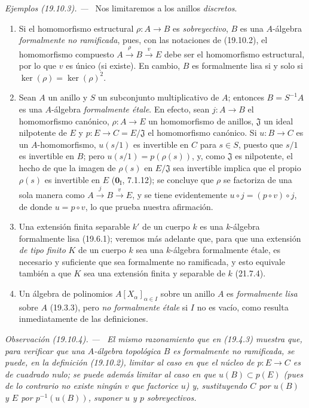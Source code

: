 \documentclass[10pt,oneside]{book}
\makeatletter
\newcommand{\setmanualcurrentlabel}[1]{\def\@currentlabel{#1}}
\newcommand{\oldpage}[2][]{%
  \setcounter{footnote}{0}%
  \marginpar{\scriptsize\textbf{#1}~|~#2}\ignorespaces}
\newenvironment{remark}[1][]{%
  \setmanualcurrentlabel{#1}\par\medskip\noindent\itshape Observación (#1). ---\ }{\par}
\newenvironment{examples}[1][]{%
  \setmanualcurrentlabel{#1}\par\medskip\noindent\textit{Ejemplos (#1). ---}\ }{\par}
\makeatother
\begin{document}
\oldpage[0\textsubscript{IV-1}]{116}

\begin{examples}[19.10.3]
\label{0.19.10.3-es}
Nos limitaremos a los anillos \emph{discretos}.
\begin{enumerate}
  \item[(i)] Si el homomorfismo estructural $\rho:A\to B$ es
  \emph{sobreyectivo}, $B$ es una $A$-álgebra \emph{formalmente no ramificada},
  pues, con las notaciones de (19.10.2), el homomorfismo compuesto
  $A\xrightarrow{\rho}B\xrightarrow{v}E$ debe ser el homomorfismo estructural,
  por lo que $v$ es único (si existe). En cambio, $B$ es formalmente lisa si y
  solo si $\ker(\rho)=\ker(\rho)^2$.
  \item[(ii)] Sean $A$ un anillo y $S$ un subconjunto multiplicativo de $A$;
  entonces $B=S^{-1}A$ es una $A$-álgebra \emph{formalmente étale}. En efecto,
  sean $j:A\to B$ el homomorfismo canónico, $\rho:A\to E$ un homomorfismo de
  anillos, $\mathfrak J$ un ideal nilpotente de $E$ y
  $p:E\to C=E/\mathfrak J$ el homomorfismo canónico. Si $u:B\to C$ es un
  $A$-homomorfismo, $u(s/1)$ es invertible en $C$ para $s\in S$, puesto que
  $s/1$ es invertible en $B$; pero $u(s/1)=p(\rho(s))$, y, como $\mathfrak J$
  es nilpotente, el hecho de que la imagen de $\rho(s)$ en $E/\mathfrak J$ sea
  invertible implica que el propio $\rho(s)$ es invertible en $E$
  ($\mathbf 0_{\mathrm I}$, 7.1.12); se concluye que $\rho$ se factoriza de una
  sola manera como $A\xrightarrow{j}B\xrightarrow{v}E$, y se tiene
  evidentemente $u\circ j=(p\circ v)\circ j$, de donde $u=p\circ v$, lo que
  prueba nuestra afirmación.
  \item[(iii)] Una extensión finita separable $k'$ de un cuerpo $k$ es una
  $k$-álgebra formalmente lisa (19.6.1); veremos más adelante que, para que una
  extensión \emph{de tipo finito} $K$ de un cuerpo $k$ sea una $k$-álgebra
  formalmente étale, es necesario y suficiente que sea formalmente no
  ramificada, y esto equivale también a que $K$ sea una extensión finita y
  separable de $k$ (21.7.4).
  \item[(iv)] Un álgebra de polinomios $A[X_\alpha]_{\alpha\in I}$ sobre un
  anillo $A$ es \emph{formalmente lisa} sobre $A$ (19.3.3), pero \emph{no
  formalmente étale} si $I$ no es vacío, como resulta inmediatamente de las
  definiciones.
\end{enumerate}
\end{examples}

\begin{remark}[19.10.4]
\label{0.19.10.4-es}
El mismo razonamiento que en (19.4.3) muestra que, para verificar que una
$A$-álgebra topológica $B$ es formalmente no ramificada, se puede, en la
definición (19.10.2), limitar al caso en que el núcleo de $p:E\to C$ es
\emph{de cuadrado nulo}; se puede además limitar al caso en que $u(B)\subset p(E)$
(pues de lo contrario no existe ningún $v$ que factorice $u$) y, sustituyendo
$C$ por $u(B)$ y $E$ por $p^{-1}(u(B))$, suponer $u$ y $p$ \emph{sobreyectivos}.
\end{remark}
\end{document}
